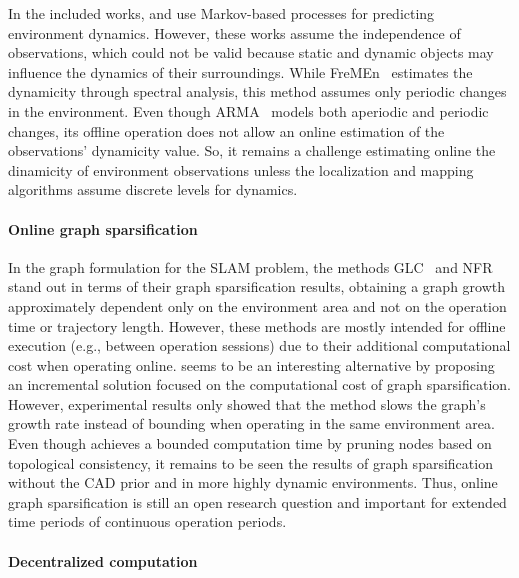In the included works, \cite{tipaldi-et-al:2013:0278364913502830} and \cite{rapp-et-al:2015:77} use Markov-based processes for predicting environment dynamics. However, these works assume the independence of observations, which could not be valid because static and dynamic objects may influence the dynamics of their surroundings. While FreMEn~\parencite{krajník-et-al:2017:2665664} estimates the dynamicity through spectral analysis, this method assumes only periodic changes in the environment. Even though ARMA~\parencite{wang-et-al:2020:9468884} models both aperiodic and periodic changes, its offline operation does not allow an online estimation of the observations' dynamicity value. So, it remains a challenge estimating online the dinamicity of environment observations unless the localization and mapping algorithms assume discrete levels for dynamics.



\paragraph{Online graph sparsification}

In the graph formulation for the SLAM problem, the methods GLC~\parencite{carlevaris-bianco-et-al:2014:2347571} and NFR~\parencite{mazuran-et-al:2016:0278364915581629} stand out in terms of their graph sparsification results, obtaining a graph growth approximately dependent only on the environment area and not on the operation time or trajectory length. However, these methods are mostly intended for offline execution (e.g., between operation sessions) due to their additional computational cost when operating online.
\cite{ila-et-al:2017:0278364917691110} seems to be an interesting alternative by proposing an incremental solution focused on the computational cost of graph sparsification. However, experimental results only showed that the method slows the graph's growth rate instead of bounding when operating in the same environment area. Even though \cite{boniardi-et-al:2019:003} achieves a bounded computation time by pruning nodes based on topological consistency, it remains to be seen the results of graph sparsification without the CAD prior and in more highly dynamic environments.
Thus, online graph sparsification is still an open research question and important for extended time periods of continuous operation periods.



\paragraph{Decentralized computation}

